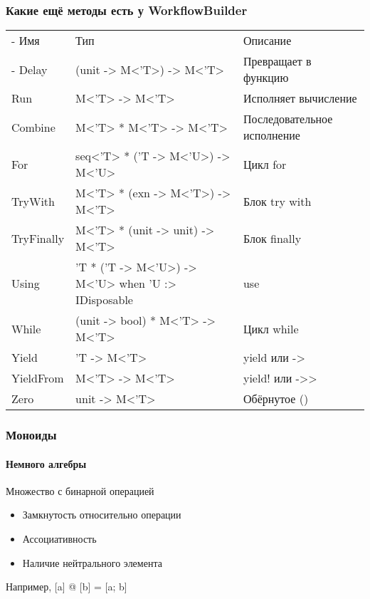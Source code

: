 \documentclass[xetex,mathserif,serif]{beamer}
\begin{document}
	\begin{frame}
		\frametitle{Какие ещё методы есть у WorkflowBuilder}
		\begin{footnotesize}
			\begin{tabu} {| X[0.5 l p] | X[1 l p] | X[1 l p] |}
				\tabucline-
				Имя                      & Тип                                                 & Описание                    \\
				\tabucline-
				\everyrow{\tabucline-}
				Delay                    & (unit -> M<'T>) -> M<'T>                            & Превращает в функцию        \\
				Run                      & M<'T> -> M<'T>                                      & Исполняет вычисление        \\
				Combine                  & M<'T> * M<'T> -> M<'T>                              & Последовательное исполнение \\
				For                      & seq<'T> * ('T -> M<'U>) -> M<'U>                    & Цикл for                    \\
				TryWith                  & M<'T> * (exn -> M<'T>) -> M<'T>                     & Блок try with               \\
				TryFinally               & M<'T> * (unit -> unit) -> M<'T>                     & Блок finally                \\
				Using                    & 'T * ('T -> M<'U>) -> M<'U> when 'U :> IDisposable  & use                         \\
				While                    & (unit -> bool) * M<'T> -> M<'T>                     & Цикл while                  \\
				Yield                    & 'T -> M<'T>                                         & yield или ->                \\
				YieldFrom                & M<'T> -> M<'T>                                      & yield! или ->>              \\
				Zero                     & unit -> M<'T>                                       & Обёрнутое ()                \\
			\end{tabu}
		\end{footnotesize}
	\end{frame}

	\begin{frame}
		\frametitle{Моноиды}
		\framesubtitle{Немного алгебры}
		Множество с бинарной операцией
		\begin{itemize}
			\item Замкнутость относительно операции
			\item Ассоциативность
			\item Наличие нейтрального элемента
		\end{itemize}
		Например, [a] @ [b] = [a; b]
	\end{frame}
\end{document}
